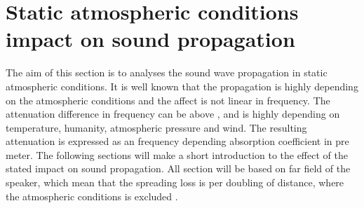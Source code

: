 \section{Static atmospheric conditions impact on sound propagation}
The aim of this section is to analyses the sound wave propagation in static atmospheric conditions. It is well known that the propagation is highly depending on the atmospheric conditions and the affect is not linear in frequency. The attenuation difference in frequency can be above  \citep{corteel2017large}, and is highly depending on temperature, humanity, atmospheric pressure and wind. The resulting attenuation is expressed as an frequency depending absorption coefficient in \db pre \si{meter}. The following sections will make a short introduction to the effect of the stated impact on sound propagation. All section will be based on far field of the speaker, which mean that the spreading loss is  per doubling of distance, where the atmospheric conditions is excluded \citep{bauman2001wavefront}  . 


